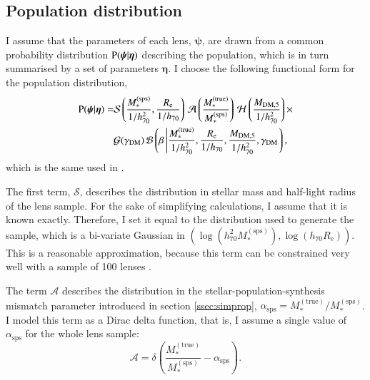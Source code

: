 \documentclass{aa}
\def\hseventy{h_{70}}
\def\mstartrue{M_*^{\mathrm{(true)}}}
\def\msps{M_*^{\mathrm{(sps)}}}
\def\mfive{M_{\mathrm{DM},5}}
\def\gammadm{\gamma_{\mathrm{DM}}}
\def\asps{\alpha_{\mathrm{sps}}}
\def\reff{R_{\mathrm{e}}}
\def\hyperpars{\boldsymbol{\eta}}
\def\indpar{\boldsymbol{\psi}}
\def\pr{{\rm P}}
\begin{document}
\subsection{Population distribution}\label{ssec:popdist}

I assume that the parameters of each lens, $\indpar$, are drawn from a common probability distribution $\pr(\indpar|\hyperpars)$ describing the population, which is in turn summarised by a set of parameters $\hyperpars$. I choose the following functional form for the population distribution,
\begin{equation}\label{eq:popdist}
\begin{split}
\pr(\indpar|\hyperpars) = & \mathcal{S}\left(\frac{\msps}{1/\hseventy^2},\frac{\reff}{1/\hseventy}\right)\,\mathcal{A}\left(\frac{\mstartrue}{\msps}\right)\,\mathcal{H}\left(\frac{\mfive}{1/\hseventy^2}\right)\times \\ 
& \mathcal{G}(\gammadm)\,\mathcal{B}\left(\beta\left\vert\frac{\mstartrue}{1/\hseventy^2},\frac{\reff}{1/\hseventy},\frac{\mfive}{1/\hseventy^2},\gammadm\right.\right),
\end{split}
\end{equation}
which is the same used in .

The first term, $\mathcal{S}$, describes the distribution in stellar mass and half-light radius of the lens sample. For the sake of simplifying calculations, I assume that it is known exactly. Therefore, I set it equal to the distribution used to generate the sample, which is a bi-variate Gaussian in $(\log{(\hseventy^2\msps)},\log{(\hseventy\reff)})$. This is a reasonable approximation, because this term can be constrained very well with a sample of 100 lenses \citep[see e.g.][]{Son++15}.

The term $\mathcal{A}$ describes the distribution in the stellar-population-synthesis mismatch parameter introduced in section \ref{ssec:simprop}, $\asps=\mstartrue/\msps$. I model this term as a Dirac delta function, that is, I assume a single value of $\asps$ for the whole lens sample:
\begin{equation}\label{eq:aterm}
\mathcal{A} = \delta\left(\frac{\mstartrue}{\msps} - \asps\right).
\end{equation}
\end{document}
